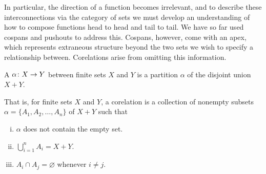 In particular, the direction of a function becomes irrelevant, and to describe
these interconnections via the category of sets we must develop an understanding
of how to compose functions head to head and tail to tail. We have so far used
cospans and pushouts to address this.  Cospans, however, come with an apex, which
represents extraneous structure beyond the two sets we wish to specify a
relationship between. Corelations arise from omitting this information.

\begin{definition}
  A  $\alpha{\colon} X \to Y$ between finite sets $X$ and $Y$ is a
partition $\alpha$ of the disjoint union $X+Y$.
\end{definition}

That is, for finite sets $X$ and $Y$, a corelation is a collection of nonempty subsets
$\alpha = \{A_1,A_2,\dots,A_n\}$ of $X+Y$ such that
\begin{enumerate}[(i)] 
  \item $\alpha$ does not contain the empty set.  
  \item $\bigcup_{i=1}^n A_i = X+Y$.
  \item $A_i \cap A_j = \varnothing$ whenever $i \ne j$.
\end{enumerate}

